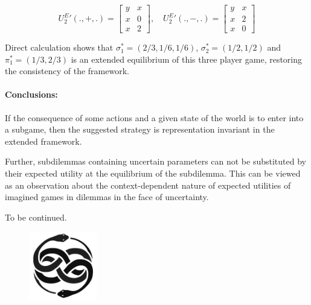 \documentclass{article}
\begin{document}
\[
{U^E_2}'(.,+,.)=
\begin{bmatrix}
y & x \\
x & 0 \\
x & 2
\end{bmatrix}, \quad
{U^E_2}'(.,-,.)=
\begin{bmatrix}
y & x \\
x & 2 \\
x & 0
\end{bmatrix}
\]

Direct calculation shows that $\sigma_1^*=(2/3,1/6,1/6)$, $\sigma_2^*=(1/2,1/2)$ and $\pi_1^*=(1/3,2/3)$ is an extended equilibrium of this three player game, restoring the consistency of the framework.

\paragraph{Conclusions:}
If the consequence of some actions and a given state of the world is to enter into a subgame, then the suggested strategy is representation invariant in the extended framework.

Further, subdilemmas containing uncertain parameters can not be substituted by their expected utility at the equilibrium of the subdilemma. This can be viewed as an observation about the context-dependent nature of expected utilities of imagined games in dilemmas in the face of uncertainty.


{\centering
\vspace{1 cm}
  \Huge To be continued.\par


\begin{figure}[h]
    \centering
    \includegraphics[width=3cm]{img/Auryn.png}
\end{figure}

}




\end{document}

